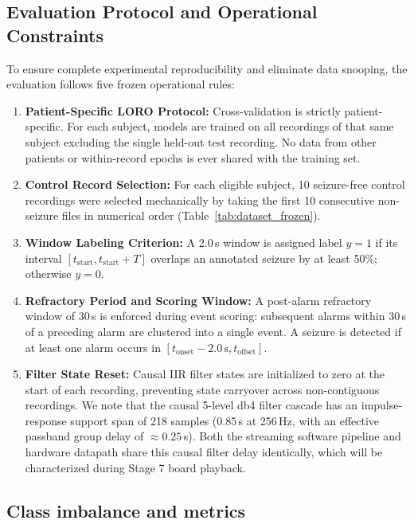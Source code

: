 \documentclass[10pt,twocolumn,letterpaper]{article}
\begin{document}
\subsection{Evaluation Protocol and Operational Constraints}
\label{sec:protocol_rules}

To ensure complete experimental reproducibility and eliminate data snooping, the evaluation follows five frozen operational rules:
\begin{enumerate}
  \item \textbf{Patient-Specific LORO Protocol:} Cross-validation is strictly patient-specific. For each subject, models are trained on all recordings of that same subject excluding the single held-out test recording. No data from other patients or within-record epochs is ever shared with the training set.
  \item \textbf{Control Record Selection:} For each eligible subject, 10 seizure-free control recordings were selected mechanically by taking the first 10 consecutive non-seizure files in numerical order (Table~\ref{tab:dataset_frozen}).
  \item \textbf{Window Labeling Criterion:} A 2.0\,s window is assigned label $y=1$ if its interval $[t_{\text{start}}, t_{\text{start}}+T]$ overlaps an annotated seizure by at least 50\%; otherwise $y=0$.
  \item \textbf{Refractory Period and Scoring Window:} A post-alarm refractory window of 30\,s is enforced during event scoring: subsequent alarms within 30\,s of a preceding alarm are clustered into a single event. A seizure is detected if at least one alarm occurs in $[t_{\text{onset}} - 2.0\,\text{s}, t_{\text{offset}}]$.
  \item \textbf{Filter State Reset:} Causal IIR filter states are initialized to zero at the start of each recording, preventing state carryover across non-contiguous recordings. We note that the causal 5-level db4 filter cascade has an impulse-response support span of 218 samples (0.85\,s at 256\,Hz, with an effective passband group delay of $\approx 0.25$\,s). Both the streaming software pipeline and hardware datapath share this causal filter delay identically, which will be characterized during Stage 7 board playback.
\end{enumerate}

\subsection{Class imbalance and metrics}
\end{document}

